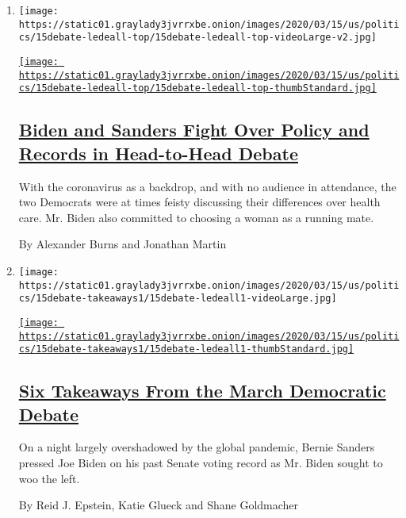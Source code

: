 \begin{enumerate}
\def\labelenumi{\arabic{enumi}.}
\item
  \texttt{[image: https://static01.graylady3jvrrxbe.onion/images/2020/03/15/us/politics/15debate-ledeall-top/15debate-ledeall-top-videoLarge-v2.jpg]}

  \href{/2020/03/15/us/politics/biden-sanders-debate-recap.html}{\texttt{[image: https://static01.graylady3jvrrxbe.onion/images/2020/03/15/us/politics/15debate-ledeall-top/15debate-ledeall-top-thumbStandard.jpg]}}

  \hypertarget{biden-and-sanders-fight-over-policy-and-records-in-head-to-head-debate}{%
  \subsection{\texorpdfstring{\href{/2020/03/15/us/politics/biden-sanders-debate-recap.html}{Biden
  and Sanders Fight Over Policy and Records in Head-to-Head
  Debate}}{Biden and Sanders Fight Over Policy and Records in Head-to-Head Debate}}\label{biden-and-sanders-fight-over-policy-and-records-in-head-to-head-debate}}

  With the coronavirus as a backdrop, and with no audience in
  attendance, the two Democrats were at times feisty discussing their
  differences over health care. Mr. Biden also committed to choosing a
  woman as a running mate.

  By Alexander Burns and Jonathan Martin
\item
  \texttt{[image: https://static01.graylady3jvrrxbe.onion/images/2020/03/15/us/politics/15debate-takeaways1/15debate-ledeall1-videoLarge.jpg]}

  \href{/2020/03/16/us/politics/takeaways-march-democratic-debate.html}{\texttt{[image: https://static01.graylady3jvrrxbe.onion/images/2020/03/15/us/politics/15debate-takeaways1/15debate-ledeall1-thumbStandard.jpg]}}

  \hypertarget{six-takeaways-from-the-march-democratic-debate}{%
  \subsection{\texorpdfstring{\href{/2020/03/16/us/politics/takeaways-march-democratic-debate.html}{Six
  Takeaways From the March Democratic
  Debate}}{Six Takeaways From the March Democratic Debate}}\label{six-takeaways-from-the-march-democratic-debate}}

  On a night largely overshadowed by the global pandemic, Bernie Sanders
  pressed Joe Biden on his past Senate voting record as Mr. Biden sought
  to woo the left.

  By Reid J. Epstein, Katie Glueck and Shane Goldmacher
\end{enumerate}

